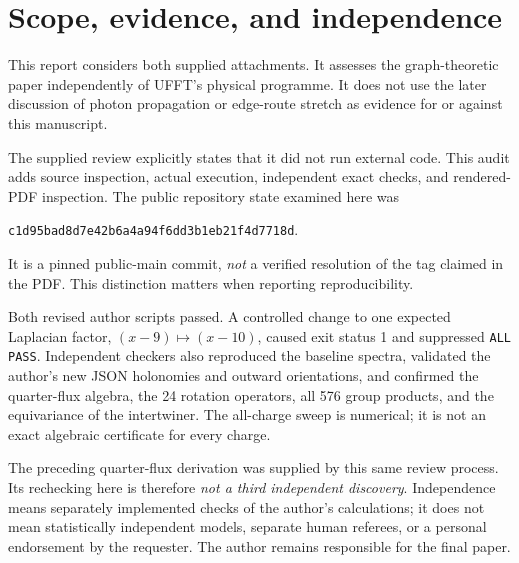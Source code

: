 \documentclass[11pt,a4paper]{article}
\begin{document}
\section{Scope, evidence, and independence}
This report considers both supplied attachments. It assesses the graph-theoretic paper independently of UFFT's physical programme. It does not use the later discussion of photon propagation or edge-route stretch as evidence for or against this manuscript.

The supplied review explicitly states that it did not run external code. This audit adds source inspection, actual execution, independent exact checks, and rendered-PDF inspection. The public repository state examined here was
\begin{center}\small
\texttt{c1d95bad8d7e42b6a4a94f6dd3b1eb21f4d7718d}.
\end{center}
It is a pinned public-main commit, \emph{not} a verified resolution of the tag claimed in the PDF. This distinction matters when reporting reproducibility.

Both revised author scripts passed. A controlled change to one expected Laplacian factor, $(x-9)\mapsto(x-10)$, caused exit status 1 and suppressed \texttt{ALL PASS}. Independent checkers also reproduced the baseline spectra, validated the author's new JSON holonomies and outward orientations, and confirmed the quarter-flux algebra, the 24 rotation operators, all 576 group products, and the equivariance of the intertwiner. The all-charge sweep is numerical; it is not an exact algebraic certificate for every charge.

The preceding quarter-flux derivation was supplied by this same review process. Its rechecking here is therefore \emph{not a third independent discovery}. Independence means separately implemented checks of the author's calculations; it does not mean statistically independent models, separate human referees, or a personal endorsement by the requester. The author remains responsible for the final paper.
\end{document}

